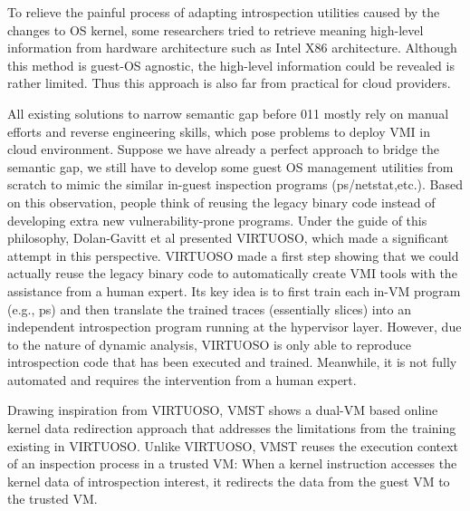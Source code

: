 To relieve the painful process of adapting introspection utilities caused by the changes to OS kernel, some researchers \cite{Reference4, Reference7}
tried to retrieve meaning high-level information from hardware architecture such as Intel X86 architecture. Although this method is guest-OS 
agnostic, the high-level information could be revealed is rather limited. Thus this approach is also far from practical for cloud providers.


All existing solutions to narrow semantic gap before 011 mostly rely on manual efforts and reverse engineering skills, which pose problems to 
deploy VMI in cloud environment. Suppose we have already a perfect approach to bridge the semantic gap, we still have to develop some guest OS 
management utilities from scratch to mimic the similar in-guest inspection programs (ps/netstat,etc.). Based on this observation, people think 
of reusing the legacy binary code instead of developing extra new vulnerability-prone programs. Under the guide of this philosophy, Dolan-Gavitt
et al \cite{Reference27} presented VIRTUOSO, which made a significant attempt in this perspective. VIRTUOSO made a first step showing that we 
could actually reuse the legacy binary code to automatically create VMI tools with the assistance from a human expert. Its key idea is to first 
train each in-VM program (e.g., ps) and then translate the trained traces (essentially slices) into an independent introspection program running
at the hypervisor layer. However, due to the nature of dynamic analysis, VIRTUOSO is only able to reproduce introspection code that has been 
executed and trained. Meanwhile, it is not fully automated and requires the intervention from a human expert.

Drawing inspiration from VIRTUOSO, VMST \cite{Reference8} shows a dual-VM based online kernel data redirection approach that addresses the 
limitations from the training existing in VIRTUOSO. Unlike VIRTUOSO, VMST reuses the execution context of an inspection process in a trusted VM:
When a kernel instruction accesses the kernel data of introspection interest, it redirects the data from the guest VM to the trusted VM.

